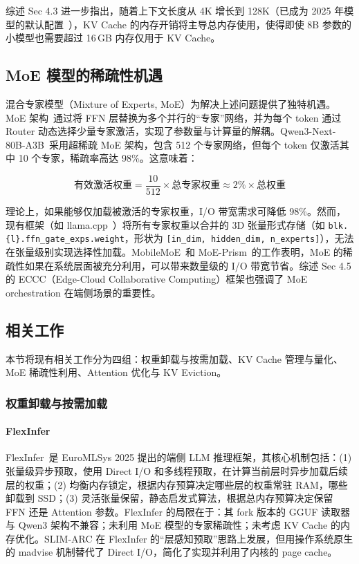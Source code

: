 综述 Sec 4.3 进一步指出，随着上下文长度从 4K 增长到 128K（已成为 2025 年模型的默认配置~\cite{survey2026}），KV Cache 的内存开销将主导总内存使用，使得即使 8B 参数的小模型也需要超过 16\,GB 内存仅用于 KV Cache。

\subsection{MoE 模型的稀疏性机遇}

混合专家模型（Mixture of Experts, MoE）为解决上述问题提供了独特机遇。MoE 架构~\cite{shazeer2017moe, fedus2022switch}通过将 FFN 层替换为多个并行的“专家”网络，并为每个 token 通过 Router 动态选择少量专家激活，实现了参数量与计算量的解耦。Qwen3-Next-80B-A3B~\cite{qwen3next2024}采用超稀疏 MoE 架构，包含 512 个专家网络，但每个 token 仅激活其中 10 个专家，稀疏率高达 98\%。这意味着：

\begin{equation}
    \text{有效激活权重} = \frac{10}{512} \times \text{总专家权重} \approx 2\% \times \text{总权重}
\end{equation}

理论上，如果能够仅加载被激活的专家权重，I/O 带宽需求可降低 98\%。然而，现有框架（如 llama.cpp~\cite{llamacpp2024}）将所有专家权重以合并的 3D 张量形式存储（如 \texttt{blk.\{l\}.ffn\_gate\_exps.weight}，形状为 \texttt{[in\_dim, hidden\_dim, n\_experts]}），无法在张量级别实现选择性加载。MobileMoE~\cite{mobilemoe2024}和 MoE-Prism~\cite{moeprism2024}的工作表明，MoE 的稀疏性如果在系统层面被充分利用，可以带来数量级的 I/O 带宽节省。综述 Sec 4.5 的 ECCC（Edge-Cloud Collaborative Computing）框架也强调了 MoE orchestration 在端侧场景的重要性。

\subsection{相关工作}

本节将现有相关工作分为四组：权重卸载与按需加载、KV Cache 管理与量化、MoE 稀疏性利用、Attention 优化与 KV Eviction。

\subsubsection{权重卸载与按需加载}

\paragraph{FlexInfer}
FlexInfer~\cite{flexinfer2025}是 EuroMLSys 2025 提出的端侧 LLM 推理框架，其核心机制包括：(1) 张量级异步预取，使用 Direct I/O 和多线程预取，在计算当前层时异步加载后续层的权重；(2) 均衡内存锁定，根据内存预算决定哪些层的权重常驻 RAM，哪些卸载到 SSD；(3) 灵活张量保留，静态启发式算法，根据总内存预算决定保留 FFN 还是 Attention 参数。FlexInfer 的局限在于：其 fork 版本的 GGUF 读取器与 Qwen3 架构不兼容；未利用 MoE 模型的专家稀疏性；未考虑 KV Cache 的内存优化。SLIM-ARC 在 FlexInfer 的“层感知预取”思路上发展，但用操作系统原生的 madvise 机制替代了 Direct I/O，简化了实现并利用了内核的 page cache。

